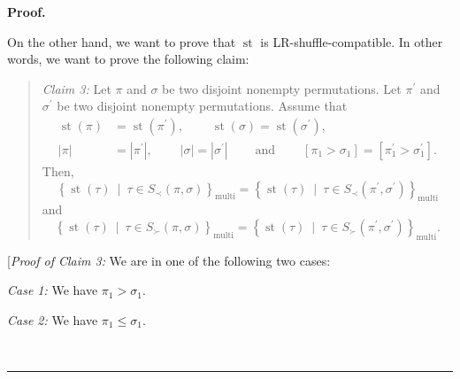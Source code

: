 \documentclass[numbers=enddot,12pt,final,onecolumn,notitlepage]{scrartcl}%
\theoremstyle{definition}
\newenvironment{statement}{\begin{quote}}{\end{quote}}
\newenvironment{proof}[1][Proof]{\noindent\textbf{#1.} }{\ \rule{0.5em}{0.5em}}
\begin{document}
\begin{proof}
\begin{statement}
\end{statement}

On the other hand, we want to prove that $\operatorname*{st}$ is
LR-shuffle-compatible. In other words, we want to prove the following claim:

\begin{statement}
\textit{Claim 3:} Let $\pi$ and $\sigma$ be two disjoint nonempty
permutations. Let $\pi^{\prime}$ and $\sigma^{\prime}$ be two disjoint
nonempty permutations. Assume that%
\begin{align*}
\operatorname*{st}\left(  \pi\right)   &  =\operatorname*{st}\left(
\pi^{\prime}\right)  ,\ \ \ \ \ \ \ \ \ \ \operatorname*{st}\left(
\sigma\right)  =\operatorname*{st}\left(  \sigma^{\prime}\right)  ,\\
\left\vert \pi\right\vert  &  =\left\vert \pi^{\prime}\right\vert
,\ \ \ \ \ \ \ \ \ \ \left\vert \sigma\right\vert =\left\vert \sigma^{\prime
}\right\vert \ \ \ \ \ \ \ \ \ \ \text{and}\ \ \ \ \ \ \ \ \ \ \left[  \pi
_{1}>\sigma_{1}\right]  =\left[  \pi_{1}^{\prime}>\sigma_{1}^{\prime}\right]
.
\end{align*}
Then,
\[
\left\{  \operatorname*{st}\left(  \tau\right)  \ \mid\ \tau\in S_{\prec
}\left(  \pi,\sigma\right)  \right\}  _{\operatorname*{multi}}=\left\{
\operatorname*{st}\left(  \tau\right)  \ \mid\ \tau\in S_{\prec}\left(
\pi^{\prime},\sigma^{\prime}\right)  \right\}  _{\operatorname*{multi}}%
\]
and%
\[
\left\{  \operatorname*{st}\left(  \tau\right)  \ \mid\ \tau\in S_{\succ
}\left(  \pi,\sigma\right)  \right\}  _{\operatorname*{multi}}=\left\{
\operatorname*{st}\left(  \tau\right)  \ \mid\ \tau\in S_{\succ}\left(
\pi^{\prime},\sigma^{\prime}\right)  \right\}  _{\operatorname*{multi}}.
\]

\end{statement}

[\textit{Proof of Claim 3:} We are in one of the following two cases:

\textit{Case 1:} We have $\pi_{1}>\sigma_{1}$.

\textit{Case 2:} We have $\pi_{1}\leq\sigma_{1}$.


\end{proof}
\end{document}
